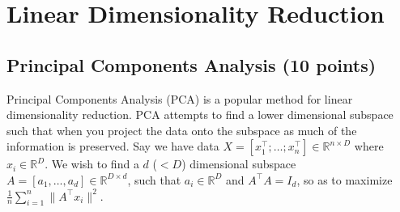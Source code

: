 \documentclass[a4paper]{article}
\theoremstyle{definition}
\newcommand{\RR}{\mathbb{R}}
\begin{document}
\section{Linear Dimensionality Reduction}

\subsection{Principal Components Analysis  (10 points)}
\label{sec:pca}

Principal Components Analysis (PCA) is a popular method for linear dimensionality reduction. PCA attempts to find a lower dimensional subspace such that when you project the data onto the subspace as much of the information is preserved. Say we have data $X = [x_1^\top; \dots; x_n^\top] \in \RR^{n\times D}$ where  $x_i \in \RR^D$. We wish to find a $d$ ($ < D$) dimensional subspace $A = [a_1, \dots, a_d] \in \RR^{D\times d}$, such that $ a_i \in \RR^D$ and $A^\top A = I_d$, so as to maximize $\frac{1}{n} \sum_{i=1}^n \|A^\top x_i\|^2$.
\end{document}
